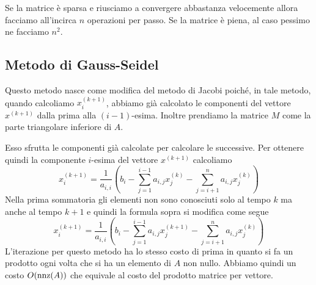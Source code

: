 Se la matrice è sparsa e riusciamo a convergere abbastanza velocemente allora facciamo all'incirca $n$ operazioni
per passo. Se la matrice è piena, al caso pessimo ne facciamo $n^2$.

\subsection{Metodo di Gauss-Seidel}
Questo metodo nasce come modifica del metodo di Jacobi poiché, in tale metodo, quando calcoliamo $x^{(k+1)}_i$,
abbiamo già calcolato le componenti del vettore $x^{(k+1)}$ dalla prima alla $(i-1)$-esima. Inoltre prendiamo
la matrice $M$ come la parte triangolare inferiore di $A$.

Esso sfrutta le componenti già calcolate per calcolare le successive. Per ottenere quindi la componente
$i$-esima del vettore $x^{(k+1)}$ calcoliamo
\[
	x^{(k+1)}_i =
	\frac{1}{a_{i,i}} \left( b_i - \sum_{j=1}^{i-1} a_{i,j} x^{(k)}_j -
	\sum_{j=i+1}^{n} a_{i,j} x^{(k)}_j \right)
\]
Nella prima sommatoria gli elementi non sono conosciuti solo al tempo $k$ ma anche al tempo $k+1$ e quindi la
formula sopra si modifica come segue
\[
	x^{(k+1)}_i =
	\frac{1}{a_{i,i}} \left( b_i - \sum_{j=1}^{i-1} a_{i,j} x^{(k+1)}_j -
	\sum_{j=i+1}^{n} a_{i,j} x^{(k)}_j \right)
\]
L'iterazione per questo metodo ha lo stesso costo di prima in quanto si fa un prodotto ogni volta che si ha un
elemento di $A$ non nullo. Abbiamo quindi un costo $O(\operatorname{nnz}(A))$ che equivale al costo del prodotto matrice per
vettore.

